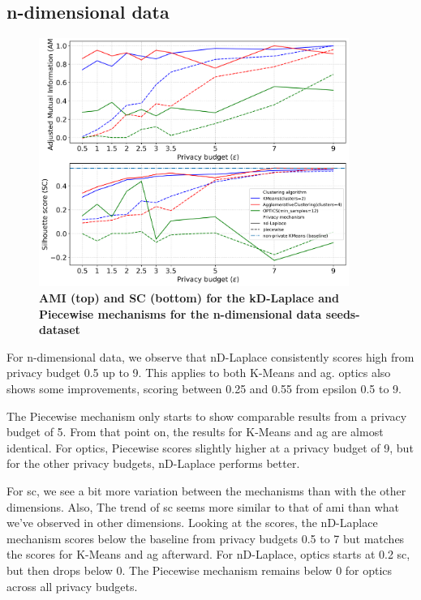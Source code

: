 {\newpage
\subsection{n-dimensional data}
\begin{figure}[H]
  \centering

  \caption{\textbf{AMI (top) and SC (bottom) for the kD-Laplace and Piecewise mechanisms for the n-dimensional data seeds-dataset}}
  \includegraphics[width=0.9\textwidth]{Results/nd-laplace/nd-Laplace/seeds-dataset/ami-and-sc_7_dimensions.png}

  \label{fig:validation-seeds-dataset_comparison_nd-laplace}
\end{figure}
For n-dimensional data, we observe that nD-Laplace consistently scores high from privacy budget 0.5 up to 9. This applies to both K-Means and \gls{ag}. \gls{optics} also shows some improvements, scoring between 0.25 and 0.55 from epsilon 0.5 to 9.

The Piecewise mechanism only starts to show comparable results from a privacy budget of 5. From that point on, the results for K-Means and \gls{ag} are almost identical. For \gls{optics}, Piecewise scores slightly higher at a privacy budget of 9, but for the other privacy budgets, nD-Laplace performs better.

For \gls{sc}, we see a bit more variation between the mechanisms than with the other dimensions. Also, The trend of \gls{sc} seems more similar to that of \gls{ami} than what we've observed in other dimensions. 
Looking at the scores, the nD-Laplace mechanism scores below the baseline from privacy budgets 0.5 to 7 but matches the scores for K-Means and \gls{ag} afterward. For nD-Laplace, \gls{optics} starts at 0.2 \gls{sc}, but then drops below 0. The Piecewise mechanism remains below 0 for \gls{optics} across all privacy budgets.

}
